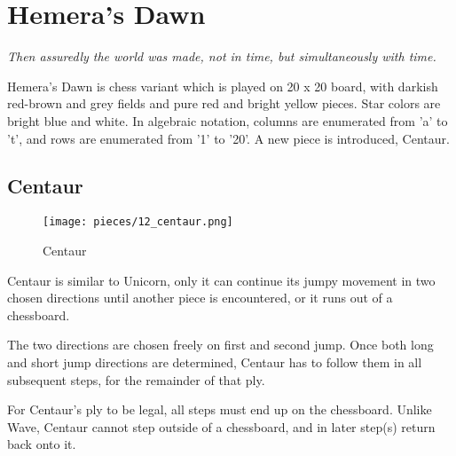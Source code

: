 

\chapter*{Hemera's Dawn}

\begin{flushright}
\parbox{0.8\textwidth}{
\emph{Then assuredly the world was made, not in time, but simultaneously with time. \\
 } }
\end{flushright}

\noindent
Hemera's Dawn is chess variant which is played on 20 x 20 board, with
darkish red-brown and grey fields and pure red and bright yellow pieces.
Star colors are bright blue and white. In algebraic notation, columns
are enumerated from 'a' to 't', and rows are enumerated from '1' to '20'.
A new piece is introduced, Centaur.

\clearpage %

\section*{Centaur}

\noindent
\begin{wrapfigure}[12]{l}{0.4\textwidth}
\centering
\texttt{[image: pieces/12\_centaur.png]}
\caption{Centaur}
\label{fig:12_centaur}
\end{wrapfigure}
Centaur is similar to Unicorn, only it can continue its jumpy movement
in two chosen directions until another piece is encountered, or it runs
out of a chessboard.

The two directions are chosen freely on first and second jump. Once both
long and short jump directions are determined, Centaur has to follow them
in all subsequent steps, for the remainder of that ply.

For Centaur's ply to be legal, all steps must end up on the chessboard.
Unlike Wave, Centaur cannot step outside of a chessboard, and in later
step(s) return back onto it.

